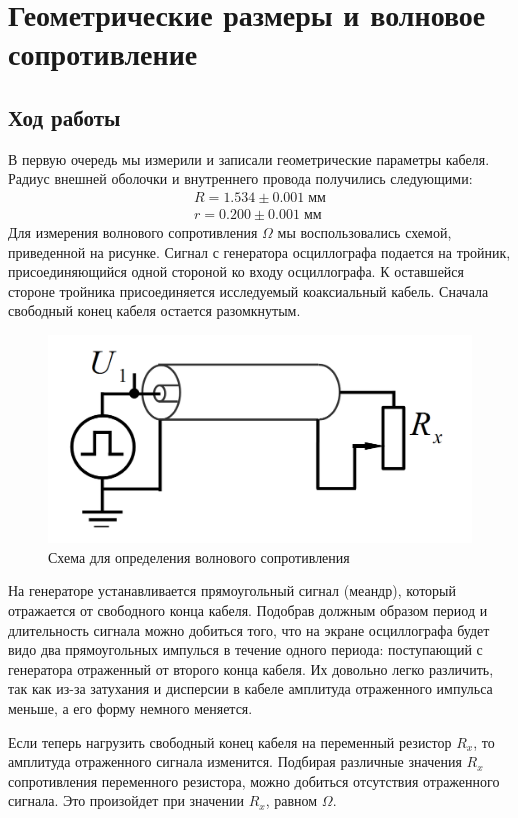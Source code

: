 \documentclass[a4paper,14pt]{extarticle}
\begin{document}
	\section{Геометрические размеры и волновое сопротивление}
		\subsection{Ход работы}
		В первую очередь мы измерили и записали геометрические параметры кабеля. Радиус внешней оболочки и внутреннего провода получились следующими:
		\begin{equation}
			\begin{gathered}
				R = 1.534 \pm 0.001 \; \text{мм} \\
				r = 0.200 \pm 0.001 \; \text{мм}
			\end{gathered}
		\end{equation}
		Для измерения волнового сопротивления $\Omega$ мы воспользовались схемой, приведенной на рисунке. Сигнал с генератора осциллографа подается на тройник, присоединяющийся одной стороной ко входу осциллографа. К оставшейся стороне тройника присоединяется исследуемый коаксиальный кабель. Сначала свободный конец кабеля остается разомкнутым.
		\begin{figure}[h!]
			\centering
			\includegraphics[width=.75\linewidth]{схема.png}
			\caption{Схема для определения волнового сопротивления}
			\label{fig1}
		\end{figure}
		На генераторе устанавливается прямоугольный сигнал (меандр), который отражается от свободного конца кабеля. Подобрав должным образом период и длительность сигнала можно добиться того, что на экране осциллографа будет видо два прямоугольных импулься в течение одного периода: поступающий с генератора отраженный от второго конца кабеля. Их довольно легко различить, так как из-за затухания и дисперсии в кабеле амплитуда отраженного импульса меньше, а его форму немного меняется.
		
		Если теперь нагрузить свободный конец кабеля на переменный резистор $R_x$, то амплитуда отраженного сигнала изменится. Подбирая различные значения $R_x$ сопротивления переменного резистора, можно добиться отсутствия отраженного сигнала. Это произойдет при значении $R_x$, равном $\Omega$.
		
\end{document}
